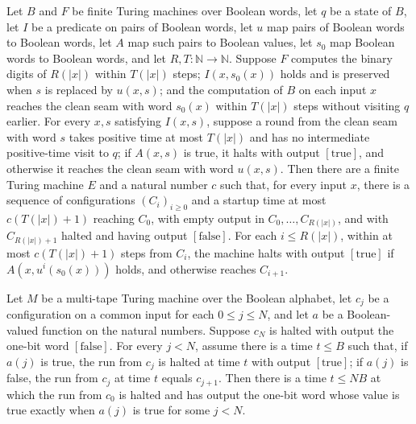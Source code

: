 \begin{theorem}
\label{Turing.FinTM.exists_loopCfgTM}
\leanok
{}
Let $B$ and $F$ be finite Turing machines over Boolean words, let $q$ be a state of $B$,
let $I$ be a predicate on pairs of Boolean words, let $u$ map pairs of Boolean words to
Boolean words, let $A$ map such pairs to Boolean values, let $s_0$ map Boolean words to
Boolean words, and let $R,T : \mathbb{N} \to \mathbb{N}$. Suppose $F$ computes the
binary digits of $R(|x|)$ within $T(|x|)$ steps; $I(x,s_0(x))$ holds and is preserved
when $s$ is replaced by $u(x,s)$; and the computation of $B$ on each input $x$ reaches
the clean seam with word $s_0(x)$ within $T(|x|)$ steps without visiting $q$ earlier.
For every $x,s$ satisfying $I(x,s)$, suppose a round from the clean seam with word $s$
takes positive time at most $T(|x|)$ and has no intermediate positive-time visit to $q$;
if $A(x,s)$ is true, it halts with output $[\mathrm{true}]$, and otherwise it reaches
the clean seam with word $u(x,s)$. Then there are a finite Turing machine $E$ and a
natural number $c$ such that, for every input $x$, there is a sequence of configurations
$(C_i)_{i\ge0}$ and a startup time at most $c(T(|x|)+1)$ reaching $C_0$, with empty
output in $C_0,\ldots,C_{R(|x|)}$, and with $C_{R(|x|)+1}$ halted and having output
$[\mathrm{false}]$. For each $i\le R(|x|)$, within at most $c(T(|x|)+1)$ steps from
$C_i$, the machine halts with output $[\mathrm{true}]$ if $A(x,u^i(s_0(x)))$ holds, and
otherwise reaches $C_{i+1}$.
\end{theorem}

\begin{lemma}
\label{Turing.FinTM.loop_halted_run}
\leanok
{}
Let $M$ be a multi-tape Turing machine over the Boolean alphabet, let $c_j$ be a
configuration on a common input for each $0\le j\le N$, and let $a$ be a Boolean-valued
function on the natural numbers. Suppose $c_N$ is halted with output the one-bit word
$[\mathrm{false}]$. For every $j<N$, assume there is a time $t\le B$ such that, if
$a(j)$ is true, the run from $c_j$ is halted at time $t$ with output $[\mathrm{true}]$;
if $a(j)$ is false, the run from $c_j$ at time $t$ equals $c_{j+1}$. Then there is a
time $t\le NB$ at which the run from $c_0$ is halted and has output the one-bit word
whose value is true exactly when $a(j)$ is true for some $j<N$.
\end{lemma}

